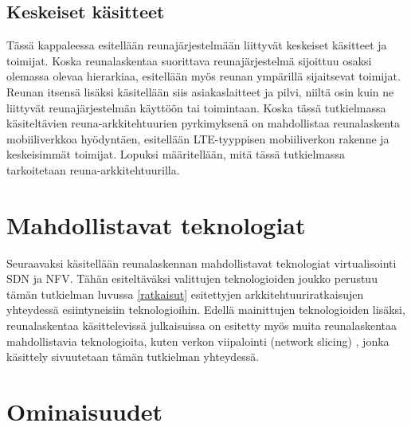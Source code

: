 \documentclass[finnish]{tktltiki2}
\theoremstyle{definition}
\theoremstyle{remark}
\begin{document}
\subsection{Keskeiset käsitteet} 
Tässä kappaleessa esitellään reunajärjestelmään liittyvät keskeiset käsitteet ja toimijat. 
Koska reunalaskentaa suorittava reunajärjestelmä sijoittuu osaksi olemassa olevaa hierarkiaa, esitellään myös reunan ympärillä sijaitsevat toimijat.
Reunan itsensä lisäksi käsitellään siis asiakaslaitteet ja pilvi, niiltä osin kuin ne liittyvät reunajärjestelmän käyttöön tai toimintaan.
Koska tässä tutkielmassa käsiteltävien reuna-arkkitehtuurien pyrkimyksenä on mahdollistaa reunalaskenta mobiiliverkkoa hyödyntäen, esitellään LTE-tyyppisen mobiiliverkon rakenne ja keskeisimmät toimijat.
Lopuksi määritellään, mitä tässä tutkielmassa tarkoitetaan reuna-arkkitehtuurilla.


 



\section{Mahdollistavat teknologiat} \label{mahd}
Seuraavaksi käsitellään reunalaskennan mahdollistavat teknologiat virtualisointi SDN ja NFV. Tähän esiteltäväksi valittujen teknologioiden joukko perustuu tämän tutkielman luvussa \ref{ratkaisut} esitettyjen arkkitehtuuriratkaisujen yhteydessä esiintyneisiin teknologioihin.
Edellä mainittujen teknologioiden lisäksi, reunalaskentaa käsittelevissä julkaisuissa on esitetty myös muita reunalaskentaa mahdollistavia teknologioita, kuten verkon viipalointi (network slicing) \cite{taleb2017multi}, jonka käsittely sivuutetaan tämän tutkielman yhteydessä.






\section{Ominaisuudet} \label{ominaisuudet}
\end{document}
